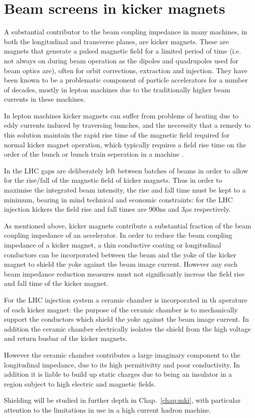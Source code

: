 \section{Beam screens in kicker magnets}
\label{sec:beam_screens}

A substantial contributor to the beam coupling impedance in many machines, in both the longitudinal and transverse planes, are kicker magnets. These are magnets that generate a pulsed magnetic field for a limited period of time (i.e. not always on during beam operation as the dipoles and quadrupoles used for beam optics are), often for orbit corrections, extraction and injection. They have been known to be a problematic component of particle accelerators for a number of decades, mostly in lepton machines due to the traditionally higher beam currents in these machines.

In lepton machines kicker magnets can suffer from problems of heating due to eddy currents induced by traversing bunches, and the neccessity that a remedy to this solution maintain the rapid rise time of the magnetic field required for normal kicker magnet operation, which typically requires a field rise time on the order of the bunch or bunch train seperation in a machine \cite{Caspers:ThinCondLayers}. 

In the LHC gaps are deliberately left between batches of beams in order to allow for the rise/fall of the magnetic field of kicker magnets. Thus in order to maximise the integrated beam intensity, the rise and fall time must be kept to a minimum, bearing in mind technical and economic constraints: for the LHC injection kickers the field rise and fall times are 900ns and 3$\mu$s respectively.

As mentioned above, kicker magnets contribute a substantial fraction of the beam coupling impedance of an accelerator. In order to reduce the beam coupling impedance of a kicker magnet, a thin conductive coating or longitudinal conductors can be incorporated between the beam and the yoke of the kicker magnet to shield the yoke against the beam image current. However any such beam impedance reduction measures must not significantly increas the field rise and fall time of the kicker magnet.

For the LHC injection system a ceramic chamber is incorporated in th aperature of each kicker magnet: the purpose of the ceramic chamber is to mechanically support the conductors which shield the yoke against the beam image current. In addition the ceramic chamber electrically isolates the shield from the high voltage and return busbar of the kicker magnets.

However the ceramic chamber contributes a large imaginary component to the longitudinal impedance, due to its high permitivitty and poor conductivity. In addition it is liable to build up static charges due to being an insulator in a region subject to high electric and magnetic fields.

Shielding will be studied in further depth in Chap.~\ref{chap:mki}, with particular attention to the limitations in use in a high current hadron machine.
